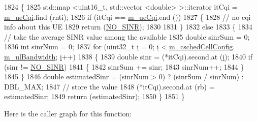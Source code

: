 \begin{DoxyCode}
1824 \{
1825   std::map <uint16\_t, std::vector <double> >::iterator itCqi = \hyperlink{classns3_1_1CqaFfMacScheduler_a263024e4342a26bfc2fabd0697da8641}{m\_ueCqi}.find (rnti);
1826   \textcolor{keywordflow}{if} (itCqi == \hyperlink{classns3_1_1CqaFfMacScheduler_a263024e4342a26bfc2fabd0697da8641}{m\_ueCqi}.end ())
1827     \{
1828       \textcolor{comment}{// no cqi info about this UE}
1829       \textcolor{keywordflow}{return} (\hyperlink{cqa-ff-mac-scheduler_8h_a520d71777be043568160c783a9c65fd5}{NO\_SINR});
1830 
1831     \}
1832   \textcolor{keywordflow}{else}
1833     \{
1834       \textcolor{comment}{// take the average SINR value among the available}
1835       \textcolor{keywordtype}{double} sinrSum = 0;
1836       \textcolor{keywordtype}{int} sinrNum = 0;
1837       \textcolor{keywordflow}{for} (uint32\_t \hyperlink{bernuolliDistribution_8m_a6f6ccfcf58b31cb6412107d9d5281426}{i} = 0; \hyperlink{bernuolliDistribution_8m_a6f6ccfcf58b31cb6412107d9d5281426}{i} < \hyperlink{classns3_1_1CqaFfMacScheduler_ad5dc768ca3a3c71671fd64de7de8ec00}{m\_cschedCellConfig}.
      \hyperlink{structns3_1_1FfMacCschedSapProvider_1_1CschedCellConfigReqParameters_a5ab5b102878e6e7e7727a14af4a64d2f}{m\_ulBandwidth}; \hyperlink{bernuolliDistribution_8m_a6f6ccfcf58b31cb6412107d9d5281426}{i}++)
1838         \{
1839           \textcolor{keywordtype}{double} sinr = (*itCqi).second.at (\hyperlink{bernuolliDistribution_8m_a6f6ccfcf58b31cb6412107d9d5281426}{i});
1840           \textcolor{keywordflow}{if} (sinr != \hyperlink{cqa-ff-mac-scheduler_8h_a520d71777be043568160c783a9c65fd5}{NO\_SINR})
1841             \{
1842               sinrSum += sinr;
1843               sinrNum++;
1844             \}
1845         \}
1846       \textcolor{keywordtype}{double} estimatedSinr = (sinrNum > 0) ? (sinrSum / sinrNum) : DBL\_MAX;
1847       \textcolor{comment}{// store the value}
1848       (*itCqi).second.at (rb) = estimatedSinr;
1849       \textcolor{keywordflow}{return} (estimatedSinr);
1850     \}
1851 \}
\end{DoxyCode}


Here is the caller graph for this function\+:


